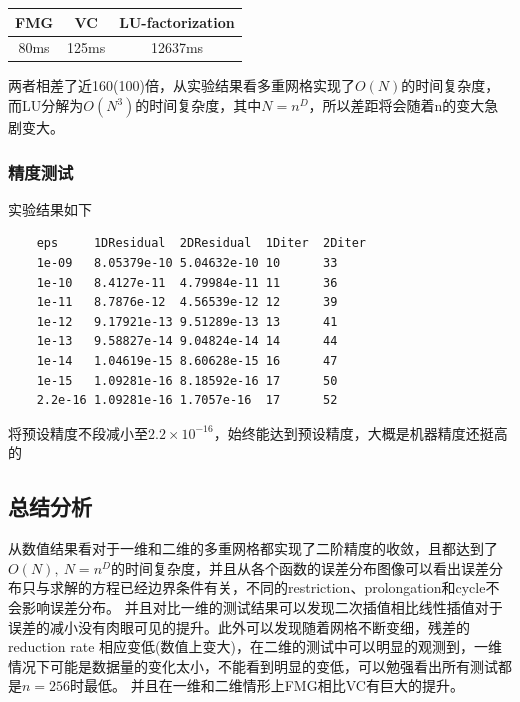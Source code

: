 \documentclass{article}
\begin{document}
\begin{center} 
    \begin{tabular}{ccc}
        \toprule
        FMG & VC & LU-factorization  \\
        \midrule
        80ms & 125ms  & 12637ms \\
        \bottomrule
    \end{tabular}
\end{center}

两者相差了近160(100)倍，从实验结果看多重网格实现了$O(N)$的时间复杂度，而LU分解为$O(N^3)$的时间复杂度，其中$N=n^D$，所以差距将会随着n的变大急剧变大。

\subsubsection{精度测试}
实验结果如下
\begin{verbatim}
    eps     1DResidual  2DResidual  1Diter  2Diter  
    1e-09   8.05379e-10 5.04632e-10 10      33      
    1e-10   8.4127e-11  4.79984e-11 11      36      
    1e-11   8.7876e-12  4.56539e-12 12      39      
    1e-12   9.17921e-13 9.51289e-13 13      41      
    1e-13   9.58827e-14 9.04824e-14 14      44      
    1e-14   1.04619e-15 8.60628e-15 16      47      
    1e-15   1.09281e-16 8.18592e-16 17      50      
    2.2e-16 1.09281e-16 1.7057e-16  17      52  
\end{verbatim}

将预设精度不段减小至$2.2\times 10^{-16}$，始终能达到预设精度，大概是机器精度还挺高的
\subsection{总结分析}
从数值结果看对于一维和二维的多重网格都实现了二阶精度的收敛，且都达到了$O(N),\ N=n^D$的时间复杂度，并且从各个函数的误差分布图像可以看出误差分布只与求解的方程已经边界条件有关，不同的restriction、prolongation和cycle不会影响误差分布。
并且对比一维的测试结果可以发现二次插值相比线性插值对于误差的减小没有肉眼可见的提升。此外可以发现随着网格不断变细，残差的reduction rate 相应变低(数值上变大)，在二维的测试中可以明显的观测到，一维情况下可能是数据量的变化太小，不能看到明显的变低，可以勉强看出所有测试都是$n=256$时最低。
并且在一维和二维情形上FMG相比VC有巨大的提升。
\end{document}
